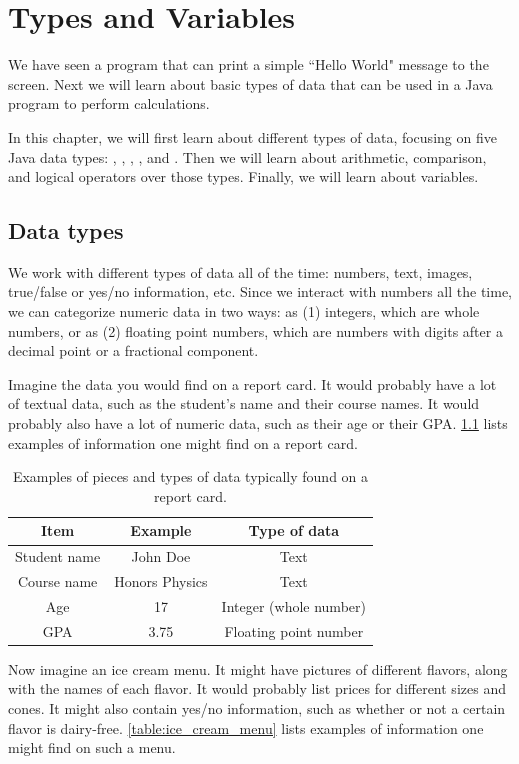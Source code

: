 \chapter{Types and Variables}

We have seen a program that can print a simple ``Hello World" message to the screen. Next we will learn about basic types of data that can be used in a Java program to perform calculations. 

In this chapter, we will first learn about different types of data, focusing on five Java data types: , , , , and . Then we will learn about arithmetic, comparison, and logical operators over those types. Finally, we will learn about variables.

\section{Data types}
We work with different types of data all of the time: numbers, text, images, true/false or yes/no information, etc. Since we interact with numbers all the time, we can categorize numeric data in two ways: as (1) integers, which are whole numbers, or as (2) floating point numbers, which are numbers with digits after a decimal point or a fractional component.

Imagine the data you would find on a report card. It would probably have a lot of textual data, such as the student's name and their course names. It would probably also have a lot of numeric data, such as their age or their GPA. \ref{table:report_card} lists examples of information one might find on a report card.

\begin{table}[h!]
\centering
\begin{tabular}{ |c|c|c| } 
 \hline
 Item & Example & Type of data \\
 \hline
 \hline
 Student name & John Doe & Text \\ 
 Course name & Honors Physics & Text \\
 Age & 17 & Integer (whole number) \\
 GPA & 3.75 & Floating point number\\ 
 \hline
\end{tabular}
\caption{Examples of pieces and types of data typically found on a report card.}
\label{table:report_card}
\end{table}

Now imagine an ice cream menu. It might have pictures of different flavors, along with the names of each flavor. It would probably list prices for different sizes and cones. It might also contain yes/no information, such as whether or not a certain flavor is dairy-free. \autoref{table:ice_cream_menu} lists examples of information one might find on such a menu.


